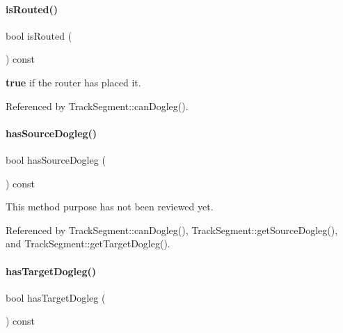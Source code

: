 \paragraph{\texorpdfstring{is\+Routed()}{isRouted()}}
{\footnotesize\ttfamily bool is\+Routed (\begin{DoxyParamCaption}{ }\end{DoxyParamCaption}) const\hspace{0.3cm}{\ttfamily [inline]}}

{\bfseries true} if the router has placed it. 

Referenced by Track\+Segment\+::can\+Dogleg().

\mbox{\label{classKite_1_1TrackElement_ab0ab07d0bdd701562ecc14bbdb41368d}} 
\paragraph{\texorpdfstring{has\+Source\+Dogleg()}{hasSourceDogleg()}}
{\footnotesize\ttfamily bool has\+Source\+Dogleg (\begin{DoxyParamCaption}{ }\end{DoxyParamCaption}) const\hspace{0.3cm}{\ttfamily [inline]}}

This method purpose has not been reviewed yet. 

Referenced by Track\+Segment\+::can\+Dogleg(), Track\+Segment\+::get\+Source\+Dogleg(), and Track\+Segment\+::get\+Target\+Dogleg().

\mbox{\label{classKite_1_1TrackElement_a2f1f15d433698222015fdda8e7fb599c}} 
\paragraph{\texorpdfstring{has\+Target\+Dogleg()}{hasTargetDogleg()}}
{\footnotesize\ttfamily bool has\+Target\+Dogleg (\begin{DoxyParamCaption}{ }\end{DoxyParamCaption}) const\hspace{0.3cm}{\ttfamily [inline]}}

